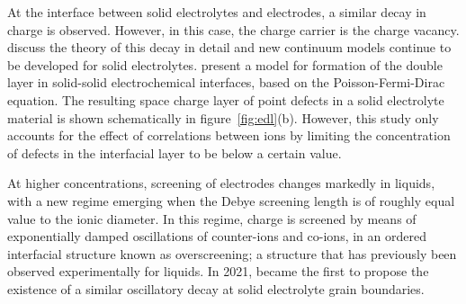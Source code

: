 \documentclass[../main.tex]{subfiles}
\begin{document}
At the interface between solid electrolytes and electrodes, a similar decay in charge is observed. However, in this case, the charge carrier is the charge vacancy. \citeauthor{Maier_ProgSolStatChem1995} discuss the theory of this decay in detail \cite{Maier_ProgSolStatChem1995} and new continuum models continue to be developed for solid electrolytes\cite{Mebane_CompMaterSci2015,MebaneAndDeSouza_EnergyEnivronSci2015,TongEtAl_JAmCeramSoc2020,Lund_2021}. \citeauthor{Swift2021} present a model for formation of the double layer in solid-solid electrochemical interfaces, based on the Poisson-Fermi-Dirac equation. The resulting space charge layer of point defects in a solid electrolyte material is shown schematically in figure~\ref{fig:edl}(b). However, this study only accounts for the effect of correlations between ions by limiting the concentration of defects in the interfacial layer to be below a certain value.

At higher concentrations, screening of electrodes changes markedly in liquids, with a new regime emerging when the Debye screening length is of roughly equal value to the ionic diameter. In this regime, charge is screened by means of exponentially damped oscillations of counter-ions and co-ions, in an ordered interfacial structure known as overscreening\cite{bazant2011double}; a structure that has previously been observed experimentally for liquids\cite{perkin_ionic_2012, groves2021surface, bowers2004surface, sloutskin2005surface}. In 2021, \citeauthor{dean2021overscreening} became the first to propose the existence of a similar oscillatory decay at solid electrolyte grain boundaries.\cite{dean2021overscreening}
\end{document}
